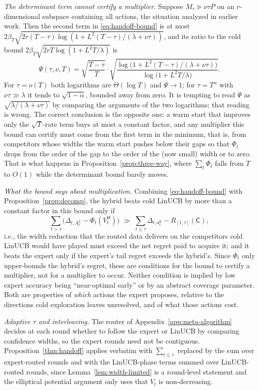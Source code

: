 \documentclass[anon]{alt2027} %
\newcommand{\Cold}{\mathsf{C}}
\newcommand{\Exp}{\mathsf{E}}
\newcommand{\Hyb}{\mathsf{H}}
\begin{document}
\emph{The determinant term cannot certify a multiplier.} Suppose
$M_\tau\succeq\nu\tau P$ on an $r$-dimensional subspace containing all actions,
the situation analyzed in earlier work. Then the second term in
\eqref{eq:handoff-bound} is at most
$2\beta_T\sqrt{2r(T-\tau)\log(1+L^2(T-\tau)/(\lambda+\nu\tau))}$, and its ratio
to the cold bound $2\beta_T\sqrt{2rT\log(1+L^2T/\lambda)}$ is
\[
\Psi(\tau,\nu,T)=\sqrt{\frac{T-\tau}{T}}\cdot\sqrt{\frac{\log\bigl(1+L^2(T-\tau)/(\lambda+\nu\tau)\bigr)}{\log\bigl(1+L^2T/\lambda\bigr)}}.
\]
For $\tau=o(T)$ both logarithms are $\Theta(\log T)$ and $\Psi\to1$; for
$\tau=T^{\alpha}$ with $\nu\tau\gg\lambda$ it tends to $\sqrt{1-\alpha}$, bounded
away from zero. It is tempting to read $\Psi$ as
$\sqrt{\lambda/(\lambda+\nu\tau)}$ by comparing the arguments of the two
logarithms; that reading is wrong. The correct conclusion is the opposite
one: a warm start that improves only the $\sqrt{T}$-rate term buys at most a
constant factor, and any multiplier this bound can certify must come from the first term in the
minimum, that is, from competitors whose widths the warm start pushes below
their gaps so that $\Phi_t$ drops from the order of the gap to the order of
the (now small) width or to zero. That is what happens in
Proposition~\ref{prop:three-way}, where $\sum_t\Phi_t$ falls from $T$ to $O(1)$
while the determinant bound barely moves.

\emph{What the bound says about multiplication.} Combining
\eqref{eq:handoff-bound} with Proposition~\ref{prop:decomp}, the hybrid beats
cold LinUCB by more than a constant factor in this bound only if
\[
\sum_{t>\tau}\bigl(\Delta_{t,A^{\Cold}_t}-\Phi_t(V^{\Hyb}_t)\bigr)
\;\gg\;
\sum_{t\le\tau}\Delta_{t,a_t^{\Exp}}-R_{[1,\tau]}(\Cold),
\]
i.e., the width reduction that the routed data delivers on the competitors
cold LinUCB would have played must exceed the net regret paid to acquire it;
and it beats the expert only if the expert's tail regret exceeds the hybrid's.
Since $\Phi_t$ only upper-bounds the hybrid's regret, these are conditions for
the bound to certify a multiplier, not for a multiplier to occur.
Neither condition is implied by low expert accuracy being ``near-optimal
early'' or by an abstract coverage parameter. Both are properties of
\emph{which} actions the expert proposes, relative to the directions cold
exploration leaves unresolved, and of what those actions cost.

\emph{Adaptive $\tau$ and interleaving.} The router of
Appendix~\ref{app:meta-algorithm} decides at each round whether to follow the
expert or LinUCB by comparing confidence widths, so the expert rounds need not
be contiguous. Proposition~\ref{thm:handoff} applies verbatim with
$\sum_{t\le\tau}$ replaced by the sum over expert-routed rounds and with the
LinUCB-phase terms summed over LinUCB-routed rounds, since
Lemma~\ref{lem:width-limited} is a round-level statement and the elliptical
potential argument only uses that $V_t$ is non-decreasing.
\end{document}
